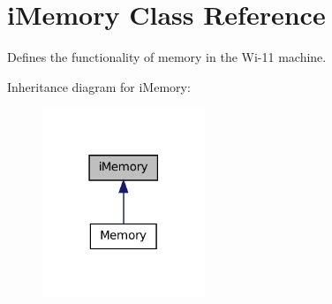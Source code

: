 \hypertarget{classiMemory}{
\section{iMemory Class Reference}
\label{classiMemory}
}


Defines the functionality of memory in the Wi-\/11 machine.  




Inheritance diagram for iMemory:
\nopagebreak
\begin{figure}[H]
\begin{center}
\leavevmode
\includegraphics[width=138pt]{classiMemory__inherit__graph}
\end{center}
\end{figure}
